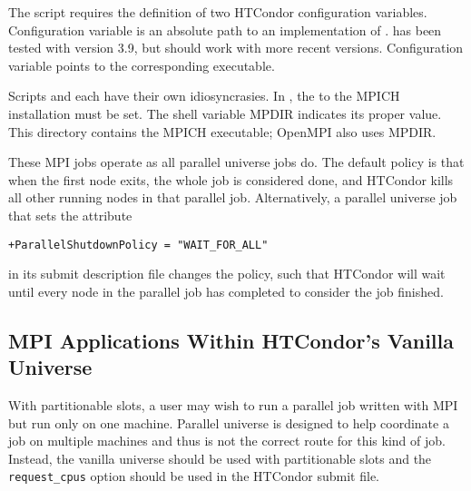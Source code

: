 The  script requires the definition of
two HTCondor configuration variables.
Configuration variable  is an absolute path to
an implementation of .
 has been tested with  version 3.9,
but should work with more recent versions.
Configuration variable  points
to the corresponding  executable.

Scripts  and 
each have their own idiosyncrasies.
In , the  to the MPICH installation must be set.
The shell variable MPDIR indicates its proper value.
This directory contains the MPICH  executable; OpenMPI also
uses MPDIR.

These MPI jobs operate as all parallel universe jobs do.
The default policy is that when the first node exits,
the whole job is considered done, 
and HTCondor kills all other running nodes in that parallel job.
Alternatively, a parallel universe job that sets the attribute
\begin{verbatim}
+ParallelShutdownPolicy = "WAIT_FOR_ALL"
\end{verbatim}
in its submit description file changes the policy,
such that HTCondor will wait until every node in the parallel 
job has completed to consider the job finished. 


\subsection{\label{sec:parallel-mpi-submit-single}MPI Applications Within HTCondor's Vanilla Universe}

With partitionable slots, a user may wish to run a parallel job written with
MPI but run only on one machine. Parallel universe is designed to help 
coordinate a job on multiple machines and thus is not the correct route for
this kind of job. Instead, the vanilla universe should be used with partitionable
slots and the \verb|request_cpus| option should be used in the HTCondor submit
file.


